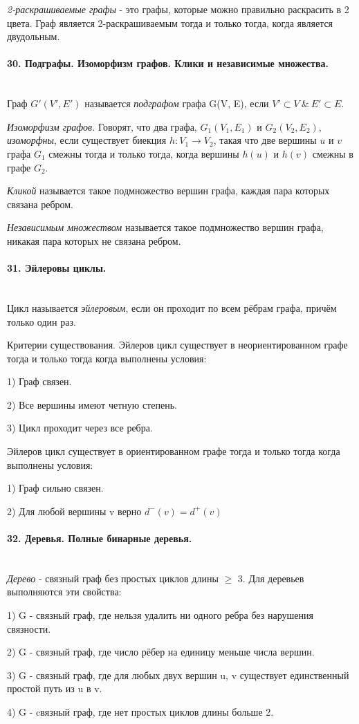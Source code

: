\documentclass[a4paper, 12pt]{article}
\newcommand{\parag}[1]{\paragraph{#1}\mbox{}\\}
\begin{document}
\noindent
\textit{2-раскрашиваемые графы} - это графы, которые можно правильно раскрасить в 2 цвета. Граф является 2-раскрашиваемым тогда и только тогда, когда является двудольным.

\parag{30. Подграфы. Изоморфизм графов. Клики и независимые множества.}
Граф $G'(V', E')$ называется \textit{подграфом} графа G(V, E), если $V' \subset V\ \&\ E' \subset E$.

\noindent
\textit{Изоморфизм графов.}
Говорят, что два графа, $G_{1}(V_{1}, E_{1})$ и $G_{2}(V_{2}, E_{2})$, \textit{изоморфны}, если существует биекция $h: V_{1} \rightarrow V_{2}$, такая что две вершины $u$ и $v$ графа $G_{1}$ смежны тогда и только тогда, когда вершины $h(u)$ и $h(v)$ смежны в графе $G_{2}$.


\noindent
\textit{Кликой} называется такое подмножество вершин графа, каждая пара которых связана ребром.

\noindent
\textit{Независимым множеством} называется такое подмножество вершин графа, никакая пара которых не связана ребром.


\parag{31. Эйлеровы циклы.}
Цикл называется \textit{эйлеровым}, если он проходит по всем рёбрам графа, причём только один раз.

\noindent
Критерии существования. Эйлеров цикл существует в неориентированном графе тогда и только тогда когда выполнены условия:

1) Граф связен.

2) Все вершины имеют четную степень.

3) Цикл проходит через все ребра.

\noindent
Эйлеров цикл существует в ориентированном графе тогда и только тогда когда выполнены условия:

1) Граф сильно связен.

2) Для любой вершины v верно $d^{-}(v) = d^{+}(v)$


\parag{32. Деревья. Полные бинарные деревья.}
\textit{Дерево} - связный граф без простых циклов длины $\geqslant$ 3. Для деревьев  выполняются эти свойства:

1) G - связный граф, где нельзя удалить ни одного ребра без нарушения связности.

2) G - связный граф, где число рёбер на единицу меньше числа вершин.

3) G - связный граф, где для любых двух вершин u, v существует единственный простой путь из u в v.

4) G - cвязный граф, где нет простых циклов длины больше 2.
\end{document}
